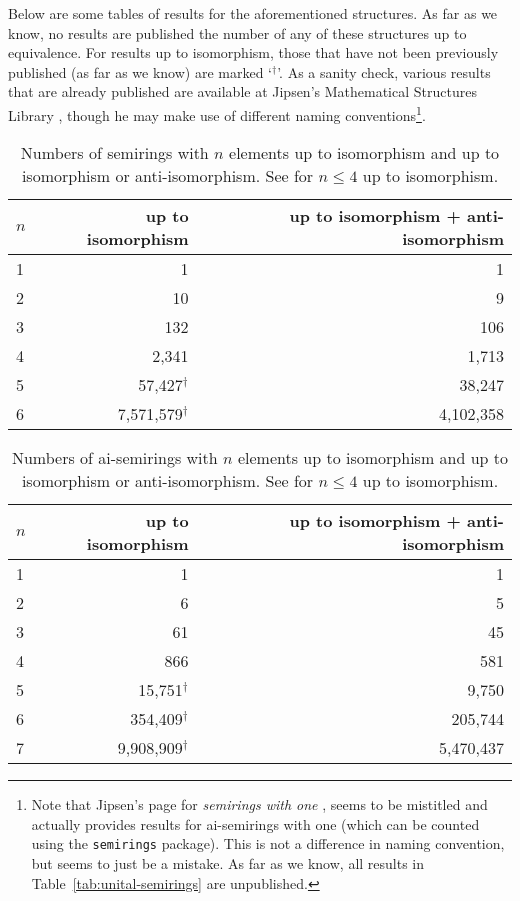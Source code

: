 \documentclass{article}
\theoremstyle{definition}
\theoremstyle{plain}
\begin{document}
Below are some tables of results for the aforementioned structures.
As far as we know, no results are published the number of any of
these structures up to equivalence. For results up to isomorphism,
those that have not been previously published (as far as we know) are
marked `$^\dagger$'. As a sanity check, various results that are already
published are available at Jipsen's Mathematical
Structures Library \cite{MathStructures}, though he may make use of different naming
conventions\footnote{Note that Jipsen's page
  for \emph{semirings with one} \cite{MSsemiringsWithOne}, seems to be mistitled and actually
  provides results for ai-semirings with one (which can be counted
  using the \texttt{semirings} package). This is not a difference in
  naming convention, but seems to just be a mistake. As far as we know,
all results in Table~\ref{tab:unital-semirings} are unpublished.}.
\begin{table}[ht]
  \centering
  \begin{tabular}{l|r|r}
    \toprule
    $n$ & up to isomorphism & up to isomorphism + anti-isomorphism \\
    \midrule
    1 & 1         & 1         \\
    2 & 10        & 9         \\
    3 & 132       & 106       \\
    4 & 2,341     & 1,713     \\
    5 & 57,427$^\dagger$    & 38,247    \\
    6 & 7,571,579$^\dagger$  & 4,102,358 \\
  \end{tabular}
  \caption{Numbers of semirings with $n$ elements up to isomorphism and up
    to isomorphism or anti-isomorphism. See \cite{MSsemirings} for \(n\leq4\) up to isomorphism.}
  \label{tab:semirings}
\end{table}

\begin{table}[ht]
  \centering
  \begin{tabular}{l|r|r}
    \toprule
    $n$ & up to isomorphism & up to isomorphism + anti-isomorphism \\
    \midrule
    1 & 1         & 1       \\
    2 & 6         & 5       \\
    3 & 61        & 45      \\
    4 & 866       & 581     \\
    5 & 15,751$^\dagger$    & 9,750   \\
    6 & 354,409$^\dagger$   & 205,744 \\
    7 & 9,908,909$^\dagger$ & 5,470,437       \\
  \end{tabular}
  \caption{Numbers of ai-semirings with $n$ elements up to isomorphism and up
    to isomorphism or anti-isomorphism. See \cite{MSidempotentSemirings} for \(n\leq4\) up to isomorphism.}
  \label{tab:ai-semirings}
\end{table}
\end{document}
